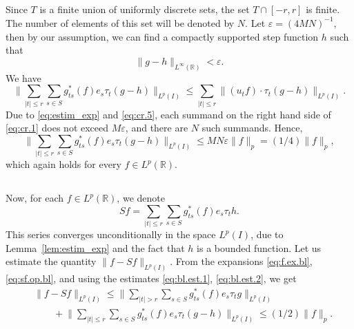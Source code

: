 \documentclass[reqno,a4paper,12pt]{amsart}
\numberwithin{equation}{section}
\numberwithin{figure}{section}
\newcommand\R{\mathbb{R}}
\newcommand\1{\mathds{1}}
\newcommand\eps{\varepsilon}
\newcommand{\TTT}{T}
\newcommand{\SSS}{S}
\newcommand{\ts}{\tau}
\renewcommand\le{\leqslant}
\theoremstyle{plain}
\newcommand{\lemref}[1]{Lemma~\ref{#1}}
\theoremstyle{definition}
\begin{document}
\subsection{}
Since $\TTT$ is a finite union of uniformly discrete sets, the
set $\TTT \cap [-r,r]$ is finite. The number of
elements of this set will be denoted by $N$. Let $\eps = (4MN)^{-1}$,
then by our assumption, we can 
find a compactly supported step function $h$ such that 
\begin{equation}
\label{eq:cr.5} 
\|g - h \|_{L^\infty(\R)} < \eps.
\end{equation}
We have
\begin{equation}
\label{eq:cr.1} 
 \Big\|   \sum_{|t| \le r}  \sum_{s\in \SSS}  
g_{ts}^*(f) e_s  \ts_t (g -  h) \Big\|_{L^p(I)} 
\le  \sum_{|t| \le r} \|  (u_t f) \cdot \ts_t (g - h) \|_{L^p(I)}.
\end{equation}
Due to \eqref{eq:estim_exp} and \eqref{eq:cr.5}, 
each summand on the right hand side of \eqref{eq:cr.1} 
does not exceed $M \eps$, and there are $N$ such 
summands. Hence,
\begin{equation}
\label{eq:bl.est.2}
 \Big\|   \sum_{|t| \le r}  \sum_{s\in \SSS}  
g_{ts}^*(f) e_s  \ts_t (g -  h) \Big\|_{L^p(I)} 
\le MN \eps \|f\|_p = (1/4) \|f\|_p,
\end{equation}
which again holds for every $f \in L^p(\R)$.


\subsection{}
Now, for each $f \in L^p(\R)$, we denote
\begin{equation}
\label{eq:sf.op.bl}
Sf =   \sum_{|t| \le r}  \sum_{s\in \SSS}  
g_{ts}^*(f) e_s   \ts_t h.
\end{equation}
This series converges unconditionally in the space $L^p(I)$,
due to \lemref{lem:estim_exp} and the fact that
$h$ is a bounded function.
Let us estimate the quantity
$\|f - Sf\|_{L^p(I)}$.
From the expansions \eqref{eq:f.ex.bl},  \eqref{eq:sf.op.bl}, 
and using the estimates
\eqref{eq:bl.est.1}, \eqref{eq:bl.est.2}, we get
\begin{align}
& \|f - S f \|_{L^p(I)} \le 
 \Big\|   \sum_{|t|>r}  \sum_{s\in \SSS}  
g_{ts}^*(f) e_s  \ts_t g \Big\|_{L^p(I)} \label{eq:sf.op.es.1} \\
&    \qquad  + 
\Big\|  \sum_{|t| \le r}  \sum_{s\in \SSS}  
g_{ts}^*(f) e_s  \ts_t (g -  h) \Big\|_{L^p(I)} 
\le  (1/2) \|f\|_p. \label{eq:sf.op.es.2} 
\end{align}
\end{document}

